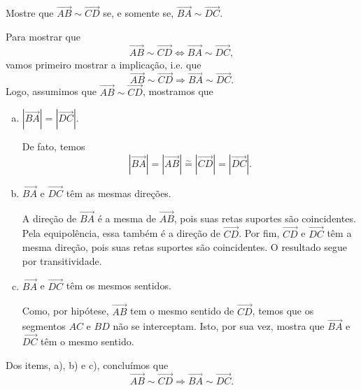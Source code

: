 \begin{exeresol}
  Mostre que $\overrightarrow{AB}\sim \overrightarrow{CD}$ se, e somente se, $\overrightarrow{BA}\sim \overrightarrow{DC}$.
\end{exeresol}
\begin{resol}
  Para mostrar que
  \begin{equation}
    \overrightarrow{AB}\sim \overrightarrow{CD} \Leftrightarrow \overrightarrow{BA}\sim \overrightarrow{DC},
  \end{equation}
  vamos primeiro mostrar a implicação, i.e. que
  \begin{equation}
    \overrightarrow{AB}\sim \overrightarrow{CD} \Rightarrow \overrightarrow{BA}\sim \overrightarrow{DC}.
  \end{equation}
  Logo, assumimos que $\overrightarrow{AB}\sim \overrightarrow{CD}$, mostramos que
  \begin{enumerate}[a)]
    \item $\left|\overrightarrow{BA}\right| = \left|\overrightarrow{DC}\right|$.
    
      De fato, temos
      \begin{equation}
        \left|\overrightarrow{BA}\right| = \left|\overrightarrow{AB}\right| \overset{\sim}{=} \left|\overrightarrow{CD}\right| = \left|\overrightarrow{DC}\right|.
      \end{equation}

    \item $\overrightarrow{BA}$ e $\overrightarrow{DC}$ têm as mesmas direções.
    
      A direção de $\overrightarrow{BA}$ é a mesma de $\overrightarrow{AB}$, pois suas retas suportes são coincidentes. Pela equipolência, essa também é a direção de $\overrightarrow{CD}$. Por fim,  $\overrightarrow{CD}$ e $\overrightarrow{DC}$ têm a mesma direção, pois suas retas suportes são coincidentes. O resultado segue por transitividade.
      
    \item $\overrightarrow{BA}$ e $\overrightarrow{DC}$ têm os mesmos sentidos.
    
      Como, por hipótese, $\overrightarrow{AB}$ tem o mesmo sentido de $\overrightarrow{CD}$, temos que os segmentos $AC$ e $BD$ não se interceptam. Isto, por sua vez, mostra que $\overrightarrow{BA}$ e $\overrightarrow{DC}$ têm o mesmo sentido.
  \end{enumerate}

  Dos items, a), b) e c), concluímos que
  \begin{equation}
    \overrightarrow{AB}\sim \overrightarrow{CD} \Rightarrow \overrightarrow{BA}\sim \overrightarrow{DC}.
  \end{equation}


\end{resol}
